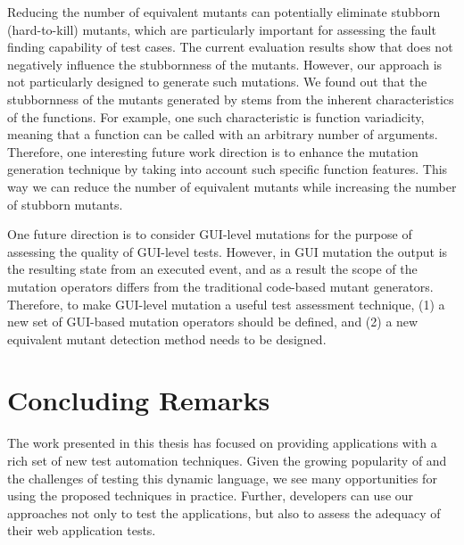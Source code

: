  Reducing the number of equivalent mutants can potentially eliminate stubborn (hard-to-kill) mutants, which are particularly important for assessing the fault finding capability of test cases. The current evaluation results show that \mutandis does not negatively influence the stubbornness of the mutants.
However, our approach is not particularly designed to generate such mutations.
We found out that the stubbornness of the mutants generated by \mutandis stems from the inherent characteristics of the \javascript functions. For example, one such characteristic is function variadicity, meaning that a function can be called with an arbitrary number of arguments. 
Therefore, one interesting future work direction is to enhance the mutation generation technique by taking into account such specific function features. This way we can reduce the number of equivalent mutants while increasing the number of stubborn mutants.

 One future direction is to consider GUI-level mutations for the purpose of assessing the quality of GUI-level tests. However, in GUI mutation the output is the resulting state from an executed event, and as a result the scope of the mutation operators differs from the traditional code-based mutant generators. Therefore, to make GUI-level mutation a useful test assessment technique, (1) a new set of GUI-based mutation operators should be defined, and (2) a new equivalent mutant detection method needs to be designed.
\section{Concluding Remarks}
The work presented in this thesis has focused on providing \javascript applications with a rich set of new test automation techniques. Given the growing popularity of \javascript and the challenges of testing this dynamic language, we see many opportunities for using the proposed techniques in practice. Further, developers can use our approaches not only to test the applications, but also to assess the adequacy of their web application tests.


